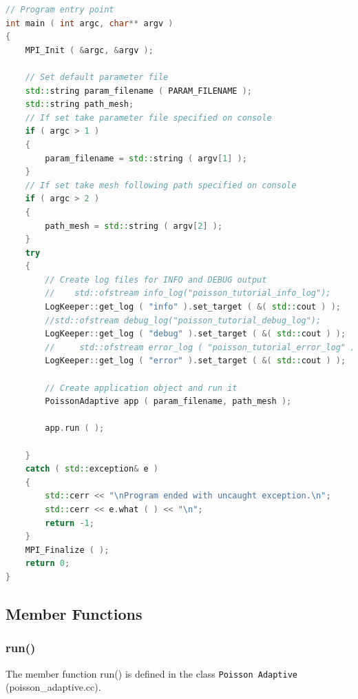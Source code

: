 \documentclass[a4paper, 11pt, twoside]{article}
\begin{document}
\begin{lstlisting}[language=C++, basicstyle={\footnotesize, \ttfamily}, keywordstyle=\color{blue}, numbers=none, tabsize=4]
// Program entry point
int main ( int argc, char** argv )
{
    MPI_Init ( &argc, &argv );

    // Set default parameter file
    std::string param_filename ( PARAM_FILENAME );
    std::string path_mesh;
    // If set take parameter file specified on console
    if ( argc > 1 )
    {
        param_filename = std::string ( argv[1] );
    }
    // If set take mesh following path specified on console
    if ( argc > 2 )
    {
        path_mesh = std::string ( argv[2] );
    }
    try
    {
        // Create log files for INFO and DEBUG output
        //    std::ofstream info_log("poisson_tutorial_info_log");
        LogKeeper::get_log ( "info" ).set_target ( &( std::cout ) );
        //std::ofstream debug_log("poisson_tutorial_debug_log");
        LogKeeper::get_log ( "debug" ).set_target ( &( std::cout ) );
        //     std::ofstream error_log ( "poisson_tutorial_error_log" );
        LogKeeper::get_log ( "error" ).set_target ( &( std::cout ) );

        // Create application object and run it
        PoissonAdaptive app ( param_filename, path_mesh );

        app.run ( );

    }
    catch ( std::exception& e )
    {
        std::cerr << "\nProgram ended with uncaught exception.\n";
        std::cerr << e.what ( ) << "\n";
        return -1;
    }
    MPI_Finalize ( );
    return 0;
}
\end{lstlisting}

\subsection{Member Functions}
\subsubsection{run()}
The member function run() is defined in the class \texttt{Poisson Adaptive} (poisson\_adaptive.cc).
\end{document}

